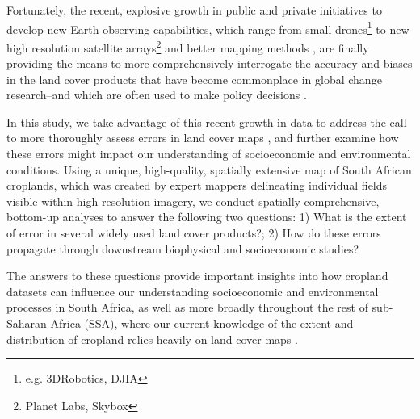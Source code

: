 \documentclass[a4paper]{article}
\begin{document}
Fortunately, the recent, explosive growth in public and private initiatives to develop new Earth observing capabilities, which range from small drones\footnote{e.g. 3DRobotics, DJIA} to new high resolution satellite arrays\footnote{Planet Labs, Skybox} and better mapping methods \citep{fritz_geo-wiki:_2012,tuanmu_global_2014,estes_projected_2013,debats_generalized_2016}, are finally providing the means to more comprehensively interrogate the accuracy and biases in the land cover products that have become commonplace in global change research--and which are often used to make policy decisions \citep{searchinger_high_2015}.  

In this study, we take advantage of this recent growth in data to address the call to more thoroughly assess errors in land cover maps \citep{kuemmerle_challenges_2013, olofsson_good_2014,olofsson_global_2012}, and further examine how these errors might impact our understanding of socioeconomic and environmental conditions. Using a unique, high-quality, spatially extensive map of South African croplands, which was created by expert mappers delineating individual fields visible within high resolution imagery, we conduct spatially comprehensive, bottom-up analyses to answer the following two questions: 1) What is the extent of error in several widely used land cover products?; 2) How do these errors propagate through downstream biophysical and socioeconomic studies? 

The answers to these questions provide important insights into how cropland datasets can influence our understanding socioeconomic and environmental processes in South Africa, as well as more broadly throughout the rest of sub-Saharan Africa (SSA), where our current knowledge of the extent and distribution of cropland relies heavily on land cover maps \citep[][]{fritz_comparison_2010, see_improved_2015}. 


\end{document}
